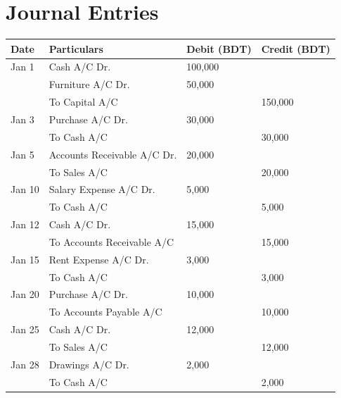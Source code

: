 \documentclass[12pt,a4paper]{book}
\begin{document}
\section*{Journal Entries}

\begin{center}
\begin{tabular}{|p{2cm}|p{8cm}|p{2.5cm}|p{2.7cm}|}
\hline
\textbf{Date} & \textbf{Particulars} & \textbf{Debit (BDT)} & \textbf{Credit (BDT)} \\
\hline
Jan 1 & Cash A/C Dr. & 100,000 & \\
      & Furniture A/C Dr. & 50,000 & \\
      & \quad To Capital A/C & & 150,000 \\
\hline
Jan 3 & Purchase A/C Dr. & 30,000 & \\
      & \quad To Cash A/C & & 30,000 \\
\hline
Jan 5 & Accounts Receivable A/C Dr. & 20,000 & \\
      & \quad To Sales A/C & & 20,000 \\
\hline
Jan 10 & Salary Expense A/C Dr. & 5,000 & \\
       & \quad To Cash A/C & & 5,000 \\
\hline
Jan 12 & Cash A/C Dr. & 15,000 & \\
       & \quad To Accounts Receivable A/C & & 15,000 \\
\hline
Jan 15 & Rent Expense A/C Dr. & 3,000 & \\
       & \quad To Cash A/C & & 3,000 \\
\hline
Jan 20 & Purchase A/C Dr. & 10,000 & \\
       & \quad To Accounts Payable A/C & & 10,000 \\
\hline
Jan 25 & Cash A/C Dr. & 12,000 & \\
       & \quad To Sales A/C & & 12,000 \\
\hline
Jan 28 & Drawings A/C Dr. & 2,000 & \\
       & \quad To Cash A/C & & 2,000 \\
\hline
\end{tabular}
\end{center}
\end{document}
